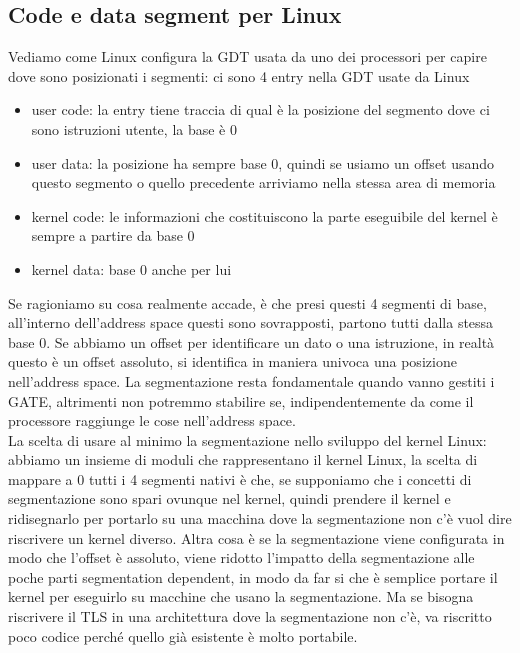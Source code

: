 \documentclass[12pt, oneside]{extbook}
\begin{document}
\subsection{Code e data segment per Linux}
Vediamo come Linux configura la GDT usata da uno dei processori per capire dove sono posizionati i segmenti: ci sono 4 entry nella GDT usate da Linux
\begin{itemize}
\item user code: la entry tiene traccia di qual è la posizione del segmento dove ci sono istruzioni utente, la base è 0
\item user data: la posizione ha sempre base 0, quindi se usiamo un offset usando questo segmento o quello precedente arriviamo nella stessa area di memoria
\item kernel code: le informazioni che costituiscono la parte eseguibile del kernel è sempre a partire da base 0
\item kernel data: base 0 anche per lui
\end{itemize}
Se ragioniamo su cosa realmente accade, è che presi questi 4 segmenti di base, all'interno dell'address space questi sono sovrapposti, partono tutti dalla stessa base 0. Se abbiamo un offset per identificare un dato o una istruzione, in realtà questo è un offset assoluto, si identifica in maniera univoca una posizione nell'address space. La segmentazione resta fondamentale quando vanno gestiti i GATE, altrimenti non potremmo stabilire se, indipendentemente da come il processore raggiunge le cose nell'address space.\\ La scelta di usare al minimo la segmentazione nello sviluppo del kernel Linux: abbiamo un insieme di moduli che rappresentano il kernel Linux, la scelta di mappare a 0 tutti i 4 segmenti nativi è che, se supponiamo che i concetti di segmentazione sono spari ovunque nel kernel, quindi prendere il kernel e ridisegnarlo per portarlo su una macchina dove la segmentazione non c'è vuol dire riscrivere un kernel diverso. Altra cosa è se la segmentazione viene configurata in modo che l'offset è assoluto, viene ridotto l'impatto della segmentazione alle poche parti segmentation dependent, in modo da far si che è semplice portare il kernel per eseguirlo su macchine che usano la segmentazione. Ma se bisogna riscrivere il TLS in una architettura dove la segmentazione non c'è, va riscritto poco codice perché quello già esistente è molto portabile.
\end{document}
